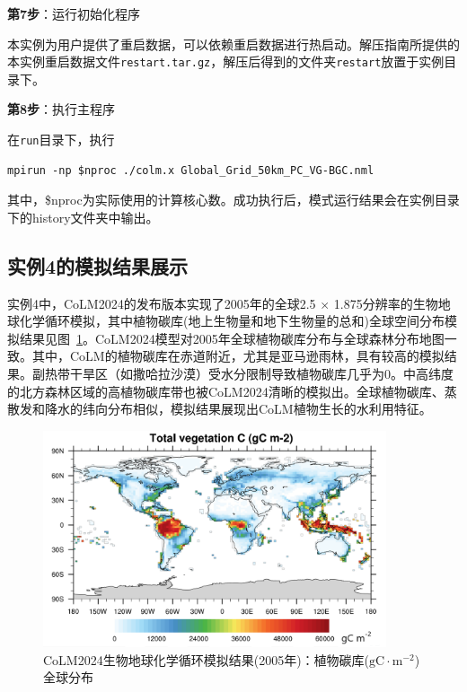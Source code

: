 \bigskip
\textbf{第7步}：运行初始化程序

本实例为用户提供了重启数据，可以依赖重启数据进行热启动。解压指南所提供的本实例重启数据文件\texttt{restart.tar.gz}，解压后得到的文件夹\texttt{restart}放置于实例目录下。

\bigskip
\textbf{第8步}：执行主程序

在\texttt{run}目录下，执行
\begin{lstlisting}[xleftmargin=2.5em]
mpirun -np $nproc ./colm.x Global_Grid_50km_PC_VG-BGC.nml
\end{lstlisting}

其中，\$nproc为实际使用的计算核心数。成功执行后，模式运行结果会在实例目录下的history文件夹中输出。


\subsection{实例4的模拟结果展示}

实例4中，CoLM2024的发布版本实现了2005年的全球2.5 \textdegree $\times$ 1.875\textdegree 分辨率的生物地球化学循环模拟，其中植物碳库(地上生物量和地下生物量的总和)全球空间分布模拟结果见图~\ref{fig:fig_example04_totvegc}。CoLM2024模型对2005年全球植物碳库分布与全球森林分布地图一致。其中，CoLM的植物碳库在赤道附近，尤其是亚马逊雨林，具有较高的模拟结果。副热带干旱区（如撒哈拉沙漠）受水分限制导致植物碳库几乎为0。中高纬度的北方森林区域的高植物碳库带也被CoLM2024清晰的模拟出。全球植物碳库、蒸散发和降水的纬向分布相似，模拟结果展现出CoLM植物生长的水利用特征。

\begin{figure}[htpb]
    \centering
    \includegraphics[width=0.90\textwidth]{figures/Example04_TotvegC_Global_Grid_2x2_PC_VG.png}
    \caption{CoLM2024生物地球化学循环模拟结果(2005年)：植物碳库($\mathrm{gC \cdot m^{-2}}$)全球分布}
    \label{fig:fig_example04_totvegc}
\end{figure}

